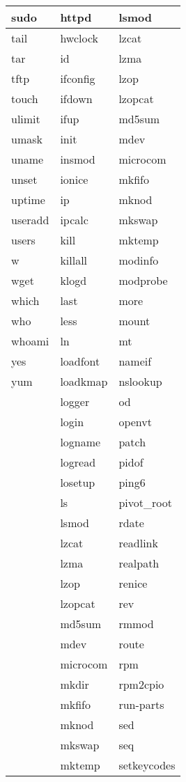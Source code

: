 \begin{longtable}{llp{64mm}}
sudo & httpd & lsmod \\ \hline
tail & hwclock & lzcat \\ \hline
tar & id & lzma \\ \hline
tftp & ifconfig & lzop \\ \hline
touch & ifdown & lzopcat \\ \hline
ulimit & ifup & md5sum \\ \hline
umask & init & mdev \\ \hline
uname & insmod & microcom \\ \hline
unset & ionice & mkfifo \\ \hline
uptime & ip & mknod \\ \hline
useradd & ipcalc & mkswap \\ \hline
users & kill & mktemp \\ \hline
w & killall & modinfo \\ \hline
wget & klogd & modprobe \\ \hline
which & last & more \\ \hline
who & less & mount \\ \hline
whoami & ln & mt \\ \hline
yes & loadfont & nameif \\ \hline
yum & loadkmap & nslookup \\ \hline
 & logger & od \\ \hline
 & login & openvt \\ \hline
 & logname & patch \\ \hline
 & logread & pidof \\ \hline
 & losetup & ping6 \\ \hline
 & ls & pivot\_root \\ \hline
 & lsmod & rdate \\ \hline
 & lzcat & readlink \\ \hline
 & lzma & realpath \\ \hline
 & lzop & renice \\ \hline
 & lzopcat & rev \\ \hline
 & md5sum & rmmod \\ \hline
 & mdev & route \\ \hline
 & microcom & rpm \\ \hline
 & mkdir & rpm2cpio \\ \hline
 & mkfifo & run-parts \\ \hline
 & mknod & sed \\ \hline
 & mkswap & seq \\ \hline
 & mktemp & setkeycodes \\ \hline

\end{longtable}
